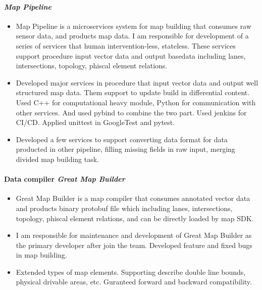     \paragraph{\textit{Map Pipeline}}
        \begin{itemize}
            \item 
                Map Pipeline is a microservices system for map building
                that consumes raw sensor data, and products map data.
                I am responsible for development of a series of services that
                human intervention-less,
                stateless.
                These services support procedure input vector data 
                and output basedata including lanes, intersections, topology, phiscal element relations.
            \item 
                Developed major services in procedure that input vector data and output well structured map data.
                Them support to update build in differential content.
                Used C++ for computational heavy module,
                Python for communication with other services.
                And used pybind to combine the two part.
                Used jenkins for CI/CD.
                Applied unittest in GoogleTest and pytest.
            \item 
                Developed a few services to support
                converting data format for data producted in other pipeline,
                filling missing fields in raw input,
                merging divided map building task.
        \end{itemize}

    \paragraph{Data compiler \textit{Great Map Builder}}
        \begin{itemize}
            \item 
                Great Map Builder is a map compiler
                that consumes annotated vector data
                and products binary protobuf file
                which including lanes, intersections, topology, phiscal element relations,
                and can be directly loaded by map SDK.
            \item 
                I am responsible for maintenance and development of Great Map Builder
                as the primary developer after join the team.
                Developed feature and fixed bugs in map building.
            \item 
                Extended types of map elements.
                Supporting describe double line bounds, physical drivable areas, etc.
                Guranteed forward and backward compatibility.
        \end{itemize}

